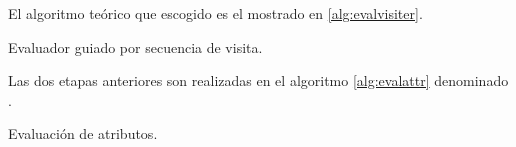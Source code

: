 El algoritmo teórico que escogido es el mostrado en \ref{alg:evalvisiter}.

\begin{algorithm}[!ht]

\vspace{-0.5cm}
\caption{\label{alg:evalvisiter}Evaluador guiado por secuencia de visita.}
\end{algorithm}

Las dos etapas anteriores son realizadas en el algoritmo \ref{alg:evalattr} denominado . 

\begin{algorithm}[!ht]

\vspace{-0.5cm}
\caption{\label{alg:evalattr}Evaluación de atributos.}
\end{algorithm}